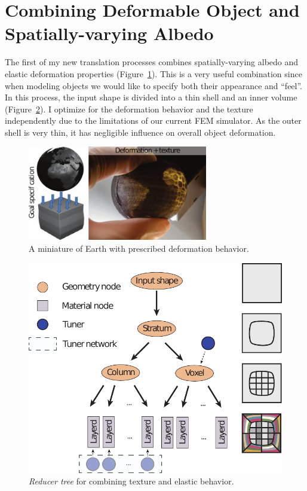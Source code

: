 \section{Combining Deformable Object and Spatially-varying Albedo}
The first of my new translation processes combines spatially-varying albedo and elastic deformation properties
(Figure~\ref{fig:globe}).
This is a very useful combination since when modeling objects we would like to specify both their appearance and ``feel''.
In this process, the input shape is divided into a thin shell and an inner volume
(Figure~\ref{fig:treeTexDef}).
I optimize for the deformation behavior and the texture independently due to the limitations of our current FEM simulator.
As the outer shell is very thin, it has negligible influence on overall object deformation.
\begin{figure}[h]
\centering
\includegraphics[width=0.7\textwidth]{figure/globe.pdf}
\caption {A miniature of Earth with prescribed deformation behavior.}
\label{fig:globe}
\end{figure}
\begin{figure}[h]
\centering
\includegraphics[scale=0.7]{figure/treeTexDef.pdf}
\caption {\emph{Reducer tree} for combining texture and elastic behavior.
}
\label{fig:treeTexDef}
\end{figure}

